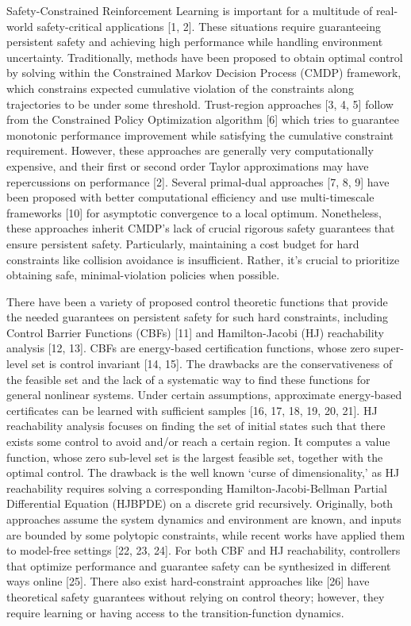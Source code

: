 \documentclass{article}
\theoremstyle{definition}
\begin{document}
Safety-Constrained Reinforcement Learning is important for a multitude of real-world safety-critical applications [1, 2]. These situations require guaranteeing persistent safety and achieving high performance while handling environment uncertainty. Traditionally, methods have been proposed to obtain optimal control by solving within the Constrained Markov Decision Process (CMDP) framework, which constrains expected cumulative violation of the constraints along trajectories to be under some threshold. Trust-region approaches [3, 4, 5] follow from the Constrained Policy Optimization algorithm [6] which tries to guarantee monotonic performance improvement while satisfying the cumulative constraint requirement. However, these approaches are generally very computationally expensive, and their first or second order Taylor approximations may have repercussions on performance [2]. Several primal-dual approaches [7, 8, 9] have been proposed with better computational efficiency and use multi-timescale frameworks [10] for asymptotic convergence to a local optimum. Nonetheless, these approaches inherit CMDP's lack of crucial rigorous safety guarantees that ensure persistent safety. Particularly, maintaining a cost budget for hard constraints like collision avoidance is insufficient. Rather, it's crucial to prioritize obtaining safe, minimal-violation policies when possible. 

 
There have been a variety of proposed control theoretic functions that provide the needed guarantees on persistent safety for such hard constraints, including Control Barrier Functions (CBFs) [11] and Hamilton-Jacobi (HJ) reachability analysis [12, 13]. CBFs are energy-based certification functions, whose zero super-level set is control invariant [14, 15]. The drawbacks are the conservativeness of the feasible set and the lack of a systematic way to find these functions for general nonlinear systems. Under certain assumptions, approximate energy-based certificates can be learned with sufficient samples [16, 17, 18, 19, 20, 21]. HJ reachability analysis focuses on finding the set of initial states such that there exists some control to avoid and/or reach a certain region. It computes a value function, whose zero sub-level set is the largest feasible set, together with the optimal control. The drawback is the well known `curse of dimensionality,' as HJ reachability requires solving a corresponding Hamilton-Jacobi-Bellman Partial Differential Equation (HJBPDE) on a discrete grid recursively. Originally, both approaches assume the system dynamics and environment are known, and inputs are bounded by some polytopic constraints, while recent works have applied them to model-free settings [22, 23, 24]. For both CBF and HJ reachability, controllers that optimize performance and guarantee safety can be synthesized in different ways online [25]. There also exist hard-constraint approaches like [26] have theoretical safety guarantees without relying on control theory; however, they require learning or having access to the transition-function dynamics.
\end{document}
